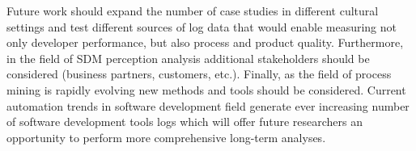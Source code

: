Future work should expand the number of case studies in different cultural settings and test different sources of log data that would enable measuring not only developer performance, but also process and product quality. Furthermore, in the field of SDM perception analysis additional stakeholders should be considered (business partners, customers, etc.). Finally, as the field of process mining is rapidly evolving new methods and tools should be considered. Current automation trends in software development field generate ever increasing number of software development tools logs which will offer future researchers an opportunity to perform more comprehensive long-term analyses. 
